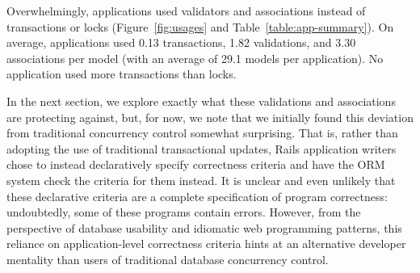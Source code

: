 Overwhelmingly, applications used validators and associations instead
of transactions or locks (Figure~\ref{fig:usages} and
Table~\ref{table:app-summary}). On average, applications used 0.13 transactions, 1.82
validations, and 3.30 associations per model (with an average of 29.1
models per application). No application used more transactions
than locks.

In the next section, we explore exactly what these validations and
associations are protecting against, but, for now, we note that we
initially found this deviation from traditional concurrency control
somewhat surprising. That is, rather than adopting the use of
traditional transactional updates, Rails application writers chose to
instead declaratively specify correctness criteria and have the ORM
system check the criteria for them instead. It is unclear and even
unlikely that these declarative criteria are a complete specification
of program correctness: undoubtedly, some of these programs contain
errors. However, from the perspective of database usability and
idiomatic web programming patterns, this reliance on application-level
correctness criteria hints at an alternative developer mentality than
users of traditional database concurrency control.

